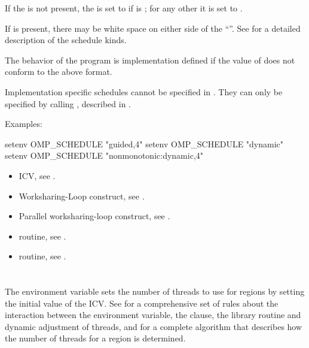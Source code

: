 If the  is not present, the  is set to  if  is ; for any other  it is set to .

If  is present, there may be white space on either side of the ``\code{,}''. See
 for a detailed description of the schedule kinds.

The behavior of the program is implementation defined if the value of 
does not conform to the above format.

Implementation specific schedules cannot be specified in . They can
only be specified by calling , described in .

Examples:

\begin{ompEnv}
setenv OMP_SCHEDULE "guided,4"
setenv OMP_SCHEDULE "dynamic"
setenv OMP_SCHEDULE "nonmonotonic:dynamic,4"
\end{ompEnv}

\crossreferences
\begin{itemize}
\item {} ICV, see .

\item Worksharing-Loop construct, see .

\item Parallel worksharing-loop construct, see .

\item {} routine, see .

\item {} routine, see .
\end{itemize}









\section{}
\label{sec:OMP_NUM_THREADS}
The  environment variable sets the number of threads to use for
 regions by setting the initial value of the  ICV. See
 for a comprehensive set of rules about the interaction between the
 environment variable, the  clause, the
 library routine and dynamic adjustment of threads, and
for a complete algorithm that describes how the number of
threads for a  region is determined.

